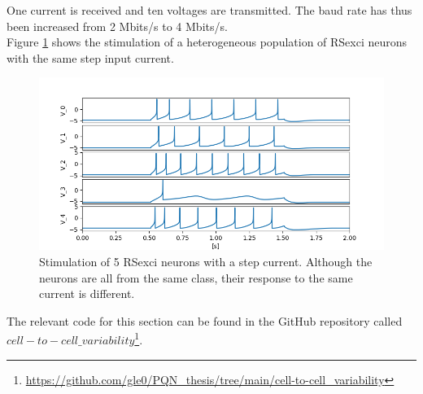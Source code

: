 One current is received and ten voltages are transmitted. The baud rate has 
thus been increased from 2 Mbits/s to 4 Mbits/s.\\
Figure \ref{fig:ctc var} shows the stimulation of a heterogeneous population 
of RSexci neurons with the same step input current.\\

\begin{figure}[hbt!]
    \begin{center}
    \includegraphics[width=1\linewidth]{img/het_pop.PNG}
    \end{center}
    \caption[Stimulation of heterogeneous neurons]{Stimulation of 5 RSexci neurons with a step current. 
    Although the neurons are all from the same class, their response to the same current is different.}
    \label{fig:ctc var}
\end{figure}

The relevant code for this section can be found in the GitHub 
repository called $cell-to-cell\_variability$\footnote{\url{https://github.com/gle0/PQN_thesis/tree/main/cell-to-cell_variability}}.\\
